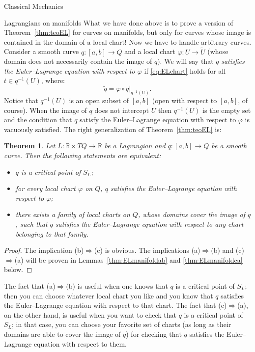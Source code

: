 \documentclass[oneside,a4paper,11pt]{amsbook}
\newcommand{\R}{\mathds R}
\theoremstyle{remark}\newtheorem{exercise}{Exercise}[chapter]
\theoremstyle{plain}\newtheorem{teo}{Theorem}[section]
\theoremstyle{plain}\newtheorem{lem}[teo]{Lemma}
\theoremstyle{plain}\newtheorem{prop}[teo]{Proposition}
\theoremstyle{plain}\newtheorem{cor}[teo]{Corollary}
\theoremstyle{definition}\newtheorem{defin}[teo]{Definition}
\theoremstyle{remark}\newtheorem{rem}[teo]{Remark}
\theoremstyle{definition}\newtheorem{notation}[teo]{Notation}
\theoremstyle{definition}\newtheorem{convention}[teo]{Convention}
\theoremstyle{definition}\newtheorem{example}[teo]{Example}
\numberwithin{section}{chapter}
\numberwithin{equation}{section}
\begin{document}
\begin{chapter}{Classical Mechanics}
\begin{section}{Lagrangians on manifolds}
What we have done above is to prove a version of Theorem~\ref{thm:teoEL} for curves on manifolds, but only for
curves whose image is contained in the domain of a local chart! Now we have to handle arbitrary curves. Consider
a smooth curve $q:[a,b]\to Q$ and a local chart $\varphi:U\to\widetilde U$ (whose domain does not necessarily
contain the image of $q$). We will say that $q$ {\em satisfies the Euler--Lagrange equation with respect to $\varphi$\/}
if \eqref{eq:ELchart} holds for all $t\in q^{-1}(U)$, where:
\begin{equation}\label{eq:defqchart}
\tilde q=\varphi\circ q\vert_{q^{-1}(U)}.
\end{equation}
Notice that $q^{-1}(U)$ is an open subset of $[a,b]$ (open with respect to $[a,b]$, of course). When the image
of $q$ does not intercept $U$ then $q^{-1}(U)$ is the empty set and the condition that $q$ satisfy the Euler--Lagrange
equation with respect to $\varphi$ is vacuously satisfied. The right generalization of Theorem~\ref{thm:teoEL} is:
\begin{teo}\label{thm:ELmanifold}
Let $L:\R\times TQ\to\R$ be a Lagrangian and $q:[a,b]\to Q$ be a smooth curve. Then the following statements
are equivalent:
\begin{itemize}
\item[(a)] $q$ is a critical point of $S_L$;
\item[(b)] for every local chart $\varphi$ on $Q$, $q$ satisfies the Euler--Lagrange equation with respect to $\varphi$;
\item[(c)] there exists a family of local charts on $Q$, whose domains cover the image of $q$, such that $q$ satisfies
the Euler--Lagrange equation with respect to any chart belonging to that family.
\end{itemize}
\end{teo}
\begin{proof}
The implication (b)$\Rightarrow$(c) is obvious. The implications (a)$\Rightarrow$(b) and (c)$\Rightarrow$(a)
will be proven in Lemmas~\ref{thm:ELmanifoldab} and \ref{thm:ELmanifoldca} below.
\end{proof}

The fact that (a)$\Rightarrow$(b) is useful when one knows that $q$ is a critical point of $S_L$; then you can
choose whatever local chart you like and you know that $q$ satisfies the Euler--Lagrange equation with respect to that
chart. The fact that (c)$\Rightarrow$(a), on the other hand, is useful when you want to check that $q$ is a critical
point of $S_L$; in that case, you can choose your favorite set of charts (as long as their domains are able to cover
the image of $q$) for checking that $q$ satisfies the Euler--Lagrange equation with respect to them.


\end{section}
\end{chapter}
\end{document}
